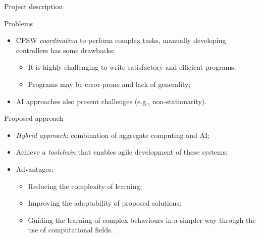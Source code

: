 \documentclass[presentation]{beamer}\mode<presentation>{\usetheme{AMSBolognaFC}}
\begin{document}
\begin{frame}[c]{Project description}

\begin{block}{Problems}
	\begin{itemize}
		\item CPSW \emph{coordination} to perform complex tasks, manually developing controllers 
			has some drawbacks:
		\begin{itemize}
			\item It is highly challenging to write satisfactory and efficient programs;
			\item Programs may be error-prone and lack of generality;
		\end{itemize}
		\item AI approaches also present challenges 
			(e.g., non-stationarity).
	\end{itemize}
\end{block}
	
\begin{alertblock}{Proposed approach}
	\begin{itemize}
		\item \emph{Hybrid approach}: combination of aggregate computing and AI;
		\item Achieve a \emph{toolchain} that enables agile development of these systems;
		\item Advantages:
		\begin{itemize}
			\item Reducing the complexity of learning;
			\item Improving the adaptability of proposed solutions;
			\item Guiding the learning of complex behaviours in a simpler way through the use of 
				computational fields.
		\end{itemize}
	\end{itemize}
\end{alertblock}

\end{frame}
\end{document}
